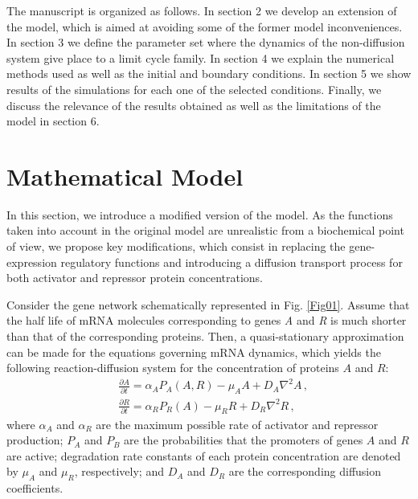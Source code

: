 \documentclass[11pt]{article}
\begin{document}
	The manuscript is organized as follows. In section 2 we develop an extension
	of the \citeauthor{Cotterell2015} model, which is aimed at avoiding
	some of the former model inconveniences. In section 3 we define the
	parameter set where the dynamics of the non-diffusion system give place to a
	limit cycle family. In section 4 we explain the numerical methods used as well
	as the initial and boundary conditions. In section 5 we show results of the
	simulations for each one of the selected conditions. Finally,
	 we discuss the relevance of the
	results obtained as well as the limitations of the model in section 6.
	
	\section{Mathematical Model}
	\label{model}
	
	In this section, we introduce a modified version of the
	\citeauthor{Cotterell2015} model. As the functions taken into account in the
	original model are unrealistic from a biochemical point of view, we propose key
	modifications, which consist in replacing the gene-expression regulatory
	functions and introducing a diffusion transport process for both activator and
	repressor protein concentrations.
	
	Consider the gene network schematically represented in Fig. \ref{Fig01}. Assume
	that the half life of mRNA molecules corresponding to genes \textit{A} and
	\textit{R} is much shorter than that of the corresponding proteins. Then, a
	quasi-stationary approximation can be made for the equations governing mRNA
	dynamics, which yields the following reaction-diffusion system for the concentration of
	proteins $A$ and $R$:
	\begin{subequations}\label{eq012}
		\begin{flalign}
		& \frac{\partial A}{\partial t} = \alpha_A P_A (A, R) - \mu_A A + D_A \nabla^2 A\,,
		\label{eq01} \\
		& \frac{\partial R}{\partial t} = \alpha_R P_R (A) - \mu_R R + D_R \nabla^2 R\,,
		\label{eq02}
		\end{flalign}
	\end{subequations}
	where $\alpha_A$ and $\alpha_R$ are the maximum possible rate of activator and
	repressor production; $P_A$ and $P_B$ are the probabilities that the promoters
	of genes $A$ and $R$ are active; degradation rate constants of each protein
	concentration are denoted by $\mu_A$ and $\mu_R$, respectively; and $D_A$ and
	$D_R$ are the corresponding diffusion coefficients.
	
\end{document}
